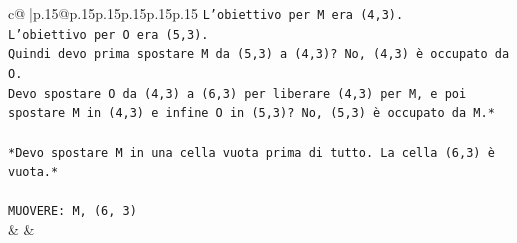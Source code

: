 \documentclass{article}
\begin{document}
{\begin{supertabular}{c@{$\;$}|p{.15\linewidth}@{}p{.15\linewidth}p{.15\linewidth}p{.15\linewidth}p{.15\linewidth}p{.15\linewidth}}
{{{\texttt{L'obiettivo per M era (4,3).} \\
\texttt{L'obiettivo per O era (5,3).} \\
\texttt{Quindi devo prima spostare M da (5,3) a (4,3)? No, (4,3) è occupato da O.} \\
\texttt{Devo spostare O da (4,3) a (6,3) per liberare (4,3) per M, e poi spostare M in (4,3) e infine O in (5,3)? No, (5,3) è occupato da M.*} \\
\\ 
\texttt{*Devo spostare M in una cella vuota prima di tutto. La cella (6,3) è vuota.*} \\
\\ 
\texttt{MUOVERE: M, (6, 3)} \\
            }
        }
    }
    & & \\ \\


\end{supertabular}}
\end{document}
